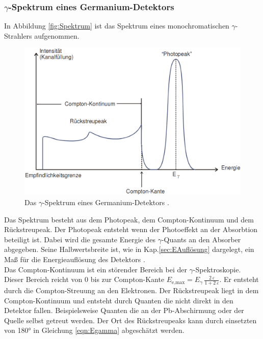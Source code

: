 \subsubsection{\texorpdfstring{$\gamma$}{}-Spektrum eines Germanium-Detektors}
In Abbildung \eqref{fig:Spektrum} ist das Spektrum eines monochromatischen $\gamma$-Strahlers aufgenommen.

\begin{figure} %
	\centering
	\includegraphics[width=0.8\linewidth]{Bilder/Spektrum.png}
	\caption{Das $\gamma$-Spektrum eines Germanium-Detektors \cite{V18}.}
	\label{fig:Spektrum}
\end{figure}

Das Spektrum besteht aus dem Photopeak, dem Compton-Kontinuum und dem Rückstreupeak. Der Photopeak entsteht wenn der Photoeffekt an der Absorbtion beteiligt ist. Dabei wird die gesamte Energie des $\gamma$-Quants an den Absorber abgegeben. Seine Halbwertsbreite ist, wie in Kap.\ref{sec:EAuflösung} dargelegt, ein Maß für die Energieauflösung des Detektors \cite[22]{V18}. \\
Das Compton-Kontinuum ist ein störender Bereich bei der $\gamma$-Spektroskopie. Dieser Bereich reicht von 0 bis zur Compton-Kante $E_\text{e,max} = E_\gamma \, \frac{2\,\varepsilon} {1 + 2\,\varepsilon}$. Er entsteht durch die Compton-Streuung an den Elektronen. Der Rückstreupeak liegt in dem Compton-Kontinuum und entsteht durch Quanten die nicht direkt in den Detektor fallen. Beispielsweise Quanten die an der Pb-Abschirmung oder der Quelle selbst getreut werden. Der Ort des Rückstreupeaks kann durch einsetzten von 180° in Gleichung \eqref{eqn:Egamma} abgeschätzt werden.



